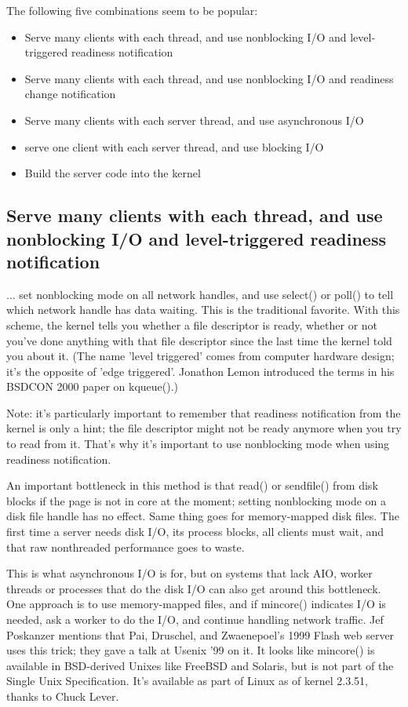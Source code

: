\documentclass[twoside, xetex]{report}
\begin{document}
The following five combinations seem to be popular:

	\begin{itemize}
	\item Serve many clients with each thread, and use nonblocking I/O and level-triggered readiness notification
	\item Serve many clients with each thread, and use nonblocking I/O and readiness change notification
	\item Serve many clients with each server thread, and use asynchronous I/O
	\item serve one client with each server thread, and use blocking I/O
	\item Build the server code into the kernel
	\end{itemize}
\subsection*{Serve many clients with each thread, and use nonblocking I/O and level-triggered readiness notification}

... set nonblocking mode on all network handles, and use select() or poll() to tell which network handle has data waiting. This is the traditional favorite. With this scheme, the kernel tells you whether a file descriptor is ready, whether or not you've done anything with that file descriptor since the last time the kernel told you about it. (The name 'level triggered' comes from computer hardware design; it's the opposite of 'edge triggered'. Jonathon Lemon introduced the terms in his BSDCON 2000 paper on kqueue().)

Note: it's particularly important to remember that readiness notification from the kernel is only a hint; the file descriptor might not be ready anymore when you try to read from it. That's why it's important to use nonblocking mode when using readiness notification.

An important bottleneck in this method is that read() or sendfile() from disk blocks if the page is not in core at the moment; setting nonblocking mode on a disk file handle has no effect. Same thing goes for memory-mapped disk files. The first time a server needs disk I/O, its process blocks, all clients must wait, and that raw nonthreaded performance goes to waste. 

This is what asynchronous I/O is for, but on systems that lack AIO, worker threads or processes that do the disk I/O can also get around this bottleneck. One approach is to use memory-mapped files, and if mincore() indicates I/O is needed, ask a worker to do the I/O, and continue handling network traffic. Jef Poskanzer mentions that Pai, Druschel, and Zwaenepoel's 1999 Flash web server uses this trick; they gave a talk at Usenix '99 on it. It looks like mincore() is available in BSD-derived Unixes like FreeBSD and Solaris, but is not part of the Single Unix Specification. It's available as part of Linux as of kernel 2.3.51, thanks to Chuck Lever.
\end{document}
